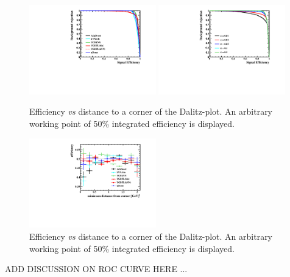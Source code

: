 \begin{figure}[] 
  \centering 
  \includegraphics[width=0.49\textwidth]{ROC_DP.pdf}
  \includegraphics[width=0.49\textwidth]{ROC_DP_Alpha.pdf}
  \caption{\label{fig:dalitz_rocs} Efficiency {\em vs} distance to a corner of the Dalitz-plot.  An arbitrary working point of 50\% integrated efficiency is displayed.}
\end{figure}

\begin{figure}[] 
  \centering 
  \includegraphics[width=0.49\textwidth]{DP_compare.pdf}
  \caption{\label{fig:dalitz_results} Efficiency {\em vs} distance to a corner of the Dalitz-plot.  An arbitrary working point of 50\% integrated efficiency is displayed.}
\end{figure}

ADD DISCUSSION ON ROC CURVE HERE ...



